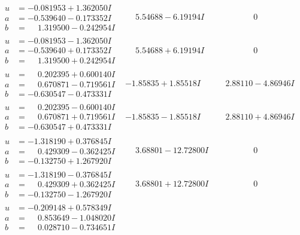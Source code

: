 \documentclass[1p]{elsarticle_modified}
\theoremstyle{definition}
\begin{document}
$$\begin{array}{c|c|c}
\begin{aligned}
u &= -0.081953 + 1.362050 I \\
a &= -0.539640 - 0.173352 I \\
b &= \phantom{-}1.319500 - 0.242954 I\end{aligned}
 & \phantom{-}5.54688 - 6.19194 I & \phantom{-0.000000 } 0 \\ \hline\begin{aligned}
u &= -0.081953 - 1.362050 I \\
a &= -0.539640 + 0.173352 I \\
b &= \phantom{-}1.319500 + 0.242954 I\end{aligned}
 & \phantom{-}5.54688 + 6.19194 I & \phantom{-0.000000 } 0 \\ \hline\begin{aligned}
u &= \phantom{-}0.202395 + 0.600140 I \\
a &= \phantom{-}0.670871 - 0.719561 I \\
b &= -0.630547 - 0.473331 I\end{aligned}
 & -1.85835 + 1.85518 I & \phantom{-}2.88110 - 4.86946 I \\ \hline\begin{aligned}
u &= \phantom{-}0.202395 - 0.600140 I \\
a &= \phantom{-}0.670871 + 0.719561 I \\
b &= -0.630547 + 0.473331 I\end{aligned}
 & -1.85835 - 1.85518 I & \phantom{-}2.88110 + 4.86946 I \\ \hline\begin{aligned}
u &= -1.318190 + 0.376845 I \\
a &= \phantom{-}0.429309 - 0.362425 I \\
b &= -0.132750 + 1.267920 I\end{aligned}
 & \phantom{-}3.68801 - 12.72800 I & \phantom{-0.000000 } 0 \\ \hline\begin{aligned}
u &= -1.318190 - 0.376845 I \\
a &= \phantom{-}0.429309 + 0.362425 I \\
b &= -0.132750 - 1.267920 I\end{aligned}
 & \phantom{-}3.68801 + 12.72800 I & \phantom{-0.000000 } 0 \\ \hline\begin{aligned}
u &= -0.209148 + 0.578349 I \\
a &= \phantom{-}0.853649 - 1.048020 I \\
b &= \phantom{-}0.028710 - 0.734651 I\end{aligned}

\end{array}$$
\end{document}
